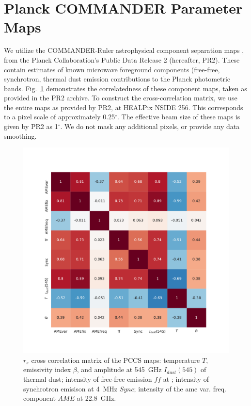   \section{Planck COMMANDER Parameter Maps}
  \label{sec:PCmaps}
       We utilize the COMMANDER-Ruler astrophysical component separation maps \citep{planckXII}, from the Planck Collaboration's Public Data Release 2 (hereafter, PR2)\citep{planck2015I}. These contain estimates of known microwave foreground components (free-free, synchrotron, thermal dust emission contributions to the Planck photometric bands. Fig.~\ref{fig:PCCS_corrmatrix} demonstrates the correlatedness of these component maps, taken as provided in the PR2 archive. To construct the cross-correlation matrix, we use the entire maps as provided by PR2, at HEALPix NSIDE 256. This corresponds to a pixel scale of approximately 0.25$^{\circ}$. The effective beam size of these maps is given by PR2 as 1$^{\circ}$. We do not mask any additional pixels, or provide any data smoothing.
         \begin{figure}
           \includegraphics[width=\textwidth]{../Plots/ch_datasources/PCCS_corrmatrix.pdf}
           \centering
           \caption{$r_{s}$ cross correlation matrix of the PCCS maps: temperature $T$, emissivity index $\beta$, and amplitude at 545~GHz $I_{dust}(545)$ of thermal dust; intensity of free-free emission $ff$ at ; intensity of synchrotron emisison at 4~MHz $Sync$; intensity of the \acrshort{ame} var. freq. component $AME$ at 22.8~GHz.}
           \label{fig:PCCS_corrmatrix}
         \end{figure}
